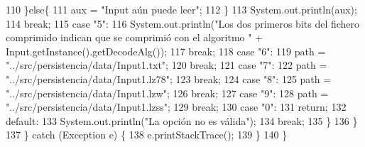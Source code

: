 \begin{DoxyCode}
110                         \}\textcolor{keywordflow}{else}\{
111                             aux = \textcolor{stringliteral}{"Input aún puede leer"};
112                         \}
113                         System.out.println(aux);
114                     \textcolor{keywordflow}{break};
115                     \textcolor{keywordflow}{case} \textcolor{stringliteral}{"5"}:
116                         System.out.println(\textcolor{stringliteral}{"Los dos primeros bits del fichero comprimido indican que se
       comprimió con el algoritmo "} + Input.getInstance().getDecodeAlg());
117                     \textcolor{keywordflow}{break};
118                     \textcolor{keywordflow}{case} \textcolor{stringliteral}{"6"}:
119                         path = \textcolor{stringliteral}{"../src/persistencia/data/Input1.txt"};
120                     \textcolor{keywordflow}{break};
121                     \textcolor{keywordflow}{case} \textcolor{stringliteral}{"7"}:
122                     path = \textcolor{stringliteral}{"../src/persistencia/data/Input1.lz78"};
123                     \textcolor{keywordflow}{break};
124                     \textcolor{keywordflow}{case} \textcolor{stringliteral}{"8"}:
125                     path = \textcolor{stringliteral}{"../src/persistencia/data/Input1.lzw"};
126                     \textcolor{keywordflow}{break};
127                     \textcolor{keywordflow}{case} \textcolor{stringliteral}{"9"}:
128                     path = \textcolor{stringliteral}{"../src/persistencia/data/Input1.lzss"};
129                     \textcolor{keywordflow}{break};
130                     \textcolor{keywordflow}{case} \textcolor{stringliteral}{"0"}:
131                         \textcolor{keywordflow}{return};
132                     \textcolor{keywordflow}{default}:
133                         System.out.println(\textcolor{stringliteral}{"La opción no es válida"});
134                     \textcolor{keywordflow}{break};
135                 \}
136             \}
137         \} \textcolor{keywordflow}{catch} (Exception e) \{
138             e.printStackTrace();
139         \}
140     \}
\end{DoxyCode}
\mbox{\label{classpersistencia_1_1input_1_1Driver____Input_a4f8a0f13847071d675771817ee212f2c}} 
